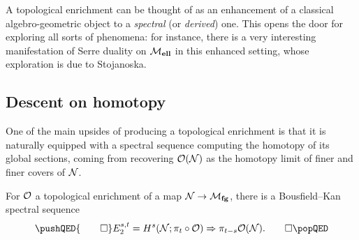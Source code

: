\begin{remark}
A topological enrichment can be thought of as an enhancement of a classical algebro-geometric object to a \textit{spectral} (or \textit{derived}) one.  This opens the door for exploring all sorts of phenomena: for instance, there is a very interesting manifestation of Serre duality on \(\mathcal{M}_{\mathbf{ell}}\) in this enhanced setting, whose exploration is due to Stojanoska.
\end{remark}




\subsection*{Descent on homotopy}

One of the main upsides of producing a topological enrichment is that it is naturally equipped with a spectral sequence computing the homotopy of its global sections, coming from recovering \(\mathcal{O}(\mathcal{N})\) as the homotopy limit of finer and finer covers of \(\mathcal{N}\).

\begin{lemma}
For \(\mathcal{O}\) a topological enrichment of a map \(\mathcal{N} \to \mathcal{M}_{\mathbf{fg}}\), there is a Bousfield--Kan spectral sequence \[\pushQED{\qed} E_2^{s, t} = H^s(\stack{N}; \pi_t \circ \sheaf O) \Rightarrow \pi_{t-s} \sheaf{O}(\stack{N}). \qedhere \popQED\]
\end{lemma}

